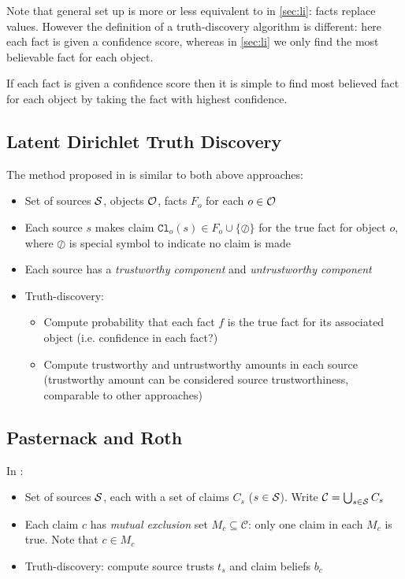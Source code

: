 \documentclass[../main.tex]{subfiles}
\begin{document}
Note that general set up is more or less equivalent to in \ref{sec:li}: facts
replace values. However the definition of a truth-discovery algorithm is
different: here each fact is given a confidence score, whereas in \ref{sec:li}
we only find the most believable fact for each object.

If each fact is given a confidence score then it is simple to find most
believed fact for each object by taking the fact with highest confidence.

\subsection{Latent Dirichlet Truth Discovery}
\label{sec:ldt}

The method proposed in \cite{zhang_qi_tang} is similar to both above approaches:

\begin{itemize}
\item Set of sources $\S$, objects $\O$, facts $F_o$ for each $o \in \O$
\item Each source $s$ makes claim $\texttt{Cl}_o(s) \in F_o \cup
\{\oslash\}$ for the true fact for object $o$, where $\oslash$ is special
symbol to indicate no claim is made
\item Each source has a \emph{trustworthy component} and \emph{untrustworthy
component}
\item Truth-discovery:
    \begin{itemize}
    \item Compute probability that each fact $f$ is the true fact for its
    associated object (i.e. confidence in each fact?)
    \item Compute trustworthy and untrustworthy amounts in each source
    (trustworthy amount can be considered source trustworthiness, comparable to
    other approaches)
    \end{itemize}
\end{itemize}

\subsection{Pasternack and Roth}
\label{sec:past}

In \cite{pasternack}:

\begin{itemize}
\item Set of sources $\S$, each with a set of claims $C_s$ ($s \in \S$). Write
$\mathcal{C} = \bigcup_{s \in \S}{C_s}$
\item Each claim $c$ has \emph{mutual exclusion} set $M_c \subseteq
\mathcal{C}$: only one claim in each $M_c$ is true. Note that $c \in M_c$
\item Truth-discovery: compute source trusts $t_s$ and claim beliefs $b_c$
\end{itemize}
\end{document}
